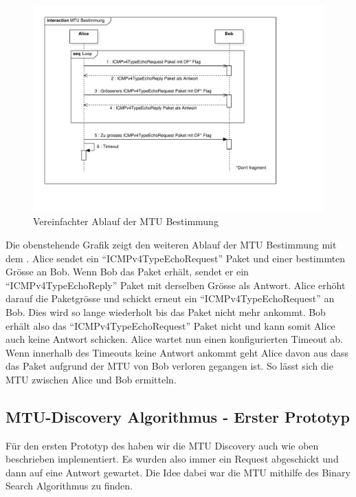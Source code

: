 \begin{figure}[H]
    \begin{center}
        \includegraphics[trim=30 80 140 20,clip,width=\textwidth]{mainpart/implementation/img/MTUBestimmungErfolgreich}
    \end{center}
    \caption{Vereinfachter Ablauf der MTU Bestimmung}
\end{figure}

Die obenstehende Grafik zeigt den weiteren Ablauf der \acs{MTU} Bestimmung mit dem \tool{}. Alice sendet ein \enquote{ICMPv4TypeEchoRequest} Paket und einer bestimmten Grösse an Bob. Wenn Bob das Paket erhält, sendet er ein \enquote{ICMPv4TypeEchoReply} Paket mit derselben Grösse als Antwort. Alice erhöht darauf die Paketgrösse und schickt erneut ein \enquote{ICMPv4TypeEchoRequest} an Bob. Dies wird so lange wiederholt bis das Paket nicht mehr ankommt. Bob erhält also das \enquote{ICMPv4TypeEchoRequest} Paket nicht und kann somit Alice auch keine Antwort schicken. Alice wartet nun einen konfigurierten Timeout ab. Wenn innerhalb des Timeouts keine Antwort ankommt geht Alice davon aus dass das Paket aufgrund der \ac{MTU} von Bob verloren gegangen ist. So lässt sich die \ac{MTU} zwischen Alice und Bob ermitteln.

\subsection{MTU-Discovery Algorithmus - Erster Prototyp}
Für den ersten Prototyp des \tool{} haben wir die \ac{MTU} Discovery auch wie oben beschrieben implementiert. Es wurden also immer ein Request abgeschickt und dann auf eine Antwort gewartet. Die Idee dabei war die \ac{MTU} mithilfe des Binary Search Algorithmus zu finden. 


